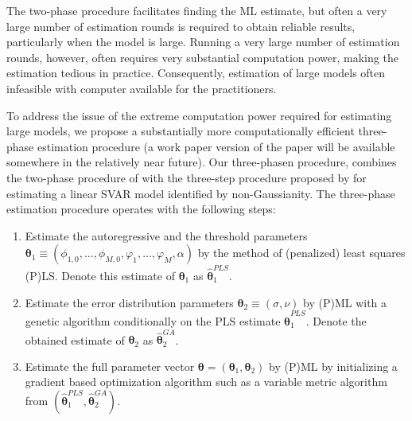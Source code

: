 \documentclass[nojss]{jss}
\begin{document}
The two-phase procedure facilitates finding the ML estimate, but often a very large number of estimation rounds is required to obtain reliable results, particularly when the model is large. Running a very large number of estimation rounds, however, often requires very substantial computation power, making the estimation tedious in practice. Consequently, estimation of large models often infeasible with computer available for the practitioners.

To address the issue of the extreme computation power required for estimating large models, we propose a substantially more computationally efficient three-phase estimation procedure (a work paper version of the paper will be available somewhere in the relatively near future). Our three-phasen procedure, combines the two-phase procedure of \cite{Virolainen2:2024} with the three-step procedure proposed by \cite{Lanne+Meitz+Saikkonen:2017} for estimating a linear SVAR model identified by non-Gaussianity. The three-phase estimation procedure operates with the following steps:
\begin{enumerate}
  \item Estimate the autoregressive and the threshold parameters $\boldsymbol{\theta}_1\equiv (\phi_{1,0},...,\phi_{M,0},\varphi_1,...,\varphi_M,\alpha)$ by the method of (penalized) least squares (P)LS. Denote this estimate of $\boldsymbol{\theta}_1$ as $\hat{\boldsymbol{\theta}}_1^{PLS}$.\label{step:LS}

  \item Estimate the error distribution parameters $\boldsymbol{\theta}_2\equiv (\sigma,\nu)$ by (P)ML with a genetic algorithm conditionally on the PLS estimate $\hat{\boldsymbol{\theta}}_1^{PLS}$. Denote the obtained estimate of $\boldsymbol{\theta}_2$ as $\hat{\boldsymbol{\theta}}_2^{GA}$.\label{step:GA}

 \item Estimate the full parameter vector $\boldsymbol{\theta}=(\boldsymbol{\theta}_1,\boldsymbol{\theta}_2)$ by (P)ML by initializing a gradient based optimization algorithm such as a variable metric algorithm \citep[e.g.,][Algorithm~21]{Nash:1990} from $(\hat{\boldsymbol{\theta}}_1^{PLS},\hat{\boldsymbol{\theta}}_2^{GA})$.\label{step:VA}
\end{enumerate}
\end{document}
